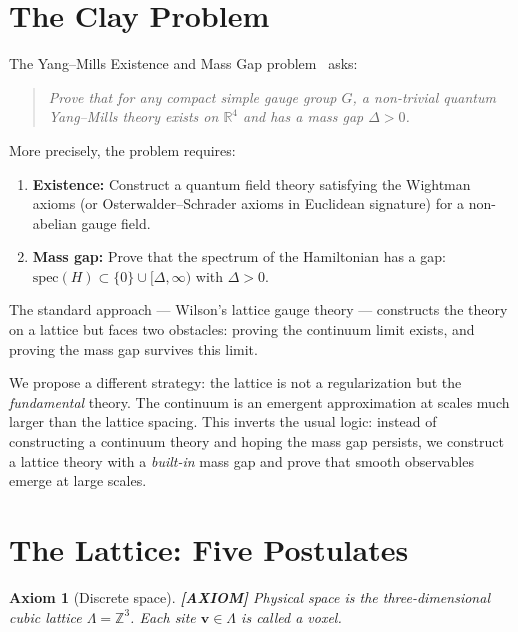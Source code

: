 \documentclass[11pt]{article}
\theoremstyle{tight}
\theoremstyle{plainroman}
\newtheorem{axiom}[theorem]{Axiom}
\newcommand{\R}{\mathbb{R}}
\newcommand{\Z}{\mathbb{Z}}
\begin{document}
\section{The Clay Problem}

The Yang--Mills Existence and Mass Gap problem~\cite{clay} asks:

\begin{quotation}
\emph{Prove that for any compact simple gauge group $G$, a non-trivial quantum Yang--Mills theory exists on $\R^4$ and has a mass gap $\Delta>0$.}
\end{quotation}

More precisely, the problem requires:
\begin{enumerate}[nosep]
\item \textbf{Existence:} Construct a quantum field theory satisfying the Wightman axioms (or Osterwalder--Schrader axioms in Euclidean signature) for a non-abelian gauge field.
\item \textbf{Mass gap:} Prove that the spectrum of the Hamiltonian has a gap: $\mathrm{spec}(H)\subset\{0\}\cup[\Delta,\infty)$ with $\Delta>0$.
\end{enumerate}

The standard approach --- Wilson's lattice gauge theory --- constructs the theory on a lattice but faces two obstacles: proving the continuum limit exists, and proving the mass gap survives this limit.

We propose a different strategy: the lattice is not a regularization but the \emph{fundamental} theory.
The continuum is an emergent approximation at scales much larger than the lattice spacing.
This inverts the usual logic: instead of constructing a continuum theory and hoping the mass gap persists, we construct a lattice theory with a \emph{built-in} mass gap and prove that smooth observables emerge at large scales.

\section{The Lattice: Five Postulates}

\begin{axiom}[Discrete space]
\textbf{[AXIOM]}
Physical space is the three-dimensional cubic lattice $\Lambda=\Z^3$.
Each site $\mathbf v\in\Lambda$ is called a voxel.
\end{axiom}
\end{document}
